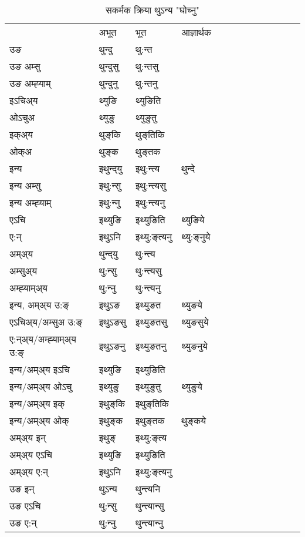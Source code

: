 \begin{table}[H]
\label{uŋt.vt} \centering
\caption{सकर्मक क्रिया  थुऽन्य  "घोच्नु"  }
\begin{tabular}{l|l|l|l|l|l|l|l|l|l|l|l|l}  \toprule
&अभूत & भूत & आज्ञार्थक \\ 
उङ &थुन्दु &थु:न्त \\ 
उङ अम्सु&थुन्दुसु &थु:न्तसु \\ 
उङ अम्ह्‍याम्&थुन्दुनु &थु:न्तनु \\ 
इऽचिअ्य &थ्युङि &थ्युङिति   \\ 
ओऽचुअ        &थ्युङु &थ्युङुतु   \\ 
इक्अ्य&थुङ्‌कि &थुङ्‌तिकि   \\ 
ओक्अ &थुङ्‌क &थुङ्‌तक   \\ 
इन्य & इथुन्द्‌यु  & इथु:न्त्य &थुन्दे  \\ 
इन्य अम्सु& इथु:न्सु  & इथु:न्त्यसु   \\ 
इन्य अम्ह्‍याम्& इथु:न्‍नु  & इथु:न्त्यनु   \\ 
एऽचि & इथ्युङि & इथ्युङिति &थ्युङिये    \\ 
ए:न् & इथुऽनि  & इथ्यु:ङ्‌त्यनु &थ्यु:ङ्‌नुये  \\ 
अम्अ्य & थुन्द्‌यु  & थु:न्त्य  \\ 
अम्सुअ्य & थु:न्सु & थु:न्त्यसु  \\ 
अम्ह्‍याम्अ्य & थु:न्‍नु  & थु:न्त्यनु \\ 
\midrule
इन्य, अम्अ्य उ:ङ्‌ &इथुऽङ &इथ्युङत &थ्युङये \\ 
एऽचिअ्य/अम्सुअ उ:ङ्‌ &इथुऽङसु &इथ्युङतसु &थ्युङसुये \\ 
ए:न्अ्य/अम्ह्‍याम्अ्य उ:ङ्‌ &इथुऽङनु &इथ्युङतनु &थ्युङनुये \\ 
इन्य/अम्अ्य इऽचि &इथ्युङि &इथ्युङिति    \\ 
इन्य/अम्अ्य ओऽचु &इथ्युङु &इथ्युङुतु  &थ्युङुये  \\ 
इन्य/अम्अ्य इक् &इथुङ्‌कि &इथुङ्‌तिकि   \\ 
इन्य/अम्अ्य ओक् &इथुङ्‌क &इथुङ्‌तक  &थुङ्‌कये  \\ 
अम्अ्य इन् & इथुङ्‌ & इथ्यु:ङ्‌त्य   \\ 
अम्अ्य एऽचि & इथ्युङि & इथ्युङिति    \\ 
अम्अ्य ए:न् & इथुऽनि  & इथ्यु:ङ्‌त्यनु  \\ 
\midrule
उङ इन् & थुऽन्य  & थुन्त्यनि  \\ 
उङ एऽचि & थु:न्सु  & थुन्त्यान्सु   \\ 
उङ ए:न्& थु:न्‍नु  & थुन्त्यान्‍नु   \\ 
\bottomrule
\end{tabular}
\end{table}


